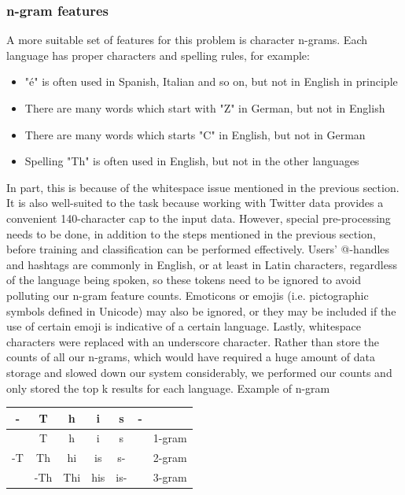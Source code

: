 \documentclass[11pt]{article}
\begin{document}
\subsubsection{n-gram features}
A more suitable set of features for this problem is character
n-grams. Each language has proper characters and spelling rules, for example:
\begin{itemize}
\item "é" is often used in Spanish, Italian and so on, but not in English in principle
\item There are many words which start with "Z" in German, but not in English
\item There are many words which starts "C" in English, but not in German
\item Spelling "Th" is often used in English, but not in the other languages
\end{itemize}
In part, this is because of the whitespace issue
mentioned in the previous section. It is also well-suited
to the task because working with Twitter data provides a
convenient 140-character cap to the input data. However,
special pre-processing needs to be done, in addition to the steps mentioned in the previous section, before training and
classification can be performed effectively. Users’ @-handles
and hashtags are commonly in English, or at least in Latin
characters, regardless of the language being spoken, so these
tokens need to be ignored to avoid polluting our n-gram feature counts. Emoticons or emojis (i.e. pictographic symbols
defined in Unicode) may also be ignored, or they may be
included if the use of certain emoji is indicative of a certain
language. Lastly, whitespace characters were replaced with
an underscore character. Rather than store the counts of all our n-grams, which would have required a huge amount of data storage and slowed down our system considerably, we performed our counts and only stored the top k results for each language. Example of n-gram\\
\begin{center}
\begin{tabular}{|c|c|c|c|c|c|c|}
\hline 
- & T & h & i & s & - &  \\ 
\hline 
 & T & h & i & s &  & 1-gram \\ 
\hline 
-T & Th & hi & is & s- &  & 2-gram \\ 
\hline 
 & -Th & Thi & his & is- &  & 3-gram \\ 
\hline 
\end{tabular} 
\end{center}
\end{document}
